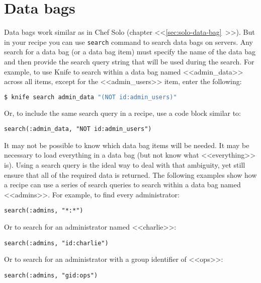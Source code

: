 \section{Data bags}
\label{sec:server-data-bags}

Data bags work similar as in Chef Solo (chapter <<\ref{sec:solo-data-bag}~>>). But in your recipe you can use \lstinline!search! command to search data bags on servers. Any search for a data bag (or a data bag item) must specify the name of the data bag and then provide the search query string that will be used during the search. For example, to use Knife to search within a data bag named <<admin\_data>> across all items, except for the <<admin\_users>> item, enter the following:

\begin{lstlisting}[language=Bash,label=lst:my-server-cloud-databag1]
$ knife search admin_data "(NOT id:admin_users)"
\end{lstlisting}

Or, to include the same search query in a recipe, use a code block similar to:

\begin{lstlisting}[label=lst:my-server-cloud-databag2]
search(:admin_data, "NOT id:admin_users")
\end{lstlisting}

It may not be possible to know which data bag items will be needed. It may be necessary to load everything in a data bag (but not know what <<everything>> is). Using a search query is the ideal way to deal with that ambiguity, yet still ensure that all of the required data is returned. The following examples show how a recipe can use a series of search queries to search within a data bag named <<admins>>. For example, to find every administrator:

\begin{lstlisting}[label=lst:my-server-cloud-databag3]
search(:admins, "*:*")
\end{lstlisting}

Or to search for an administrator named <<charlie>>:

\begin{lstlisting}[label=lst:my-server-cloud-databag4]
search(:admins, "id:charlie")
\end{lstlisting}

Or to search for an administrator with a group identifier of <<ops>>:

\begin{lstlisting}[label=lst:my-server-cloud-databag5]
search(:admins, "gid:ops")
\end{lstlisting}


